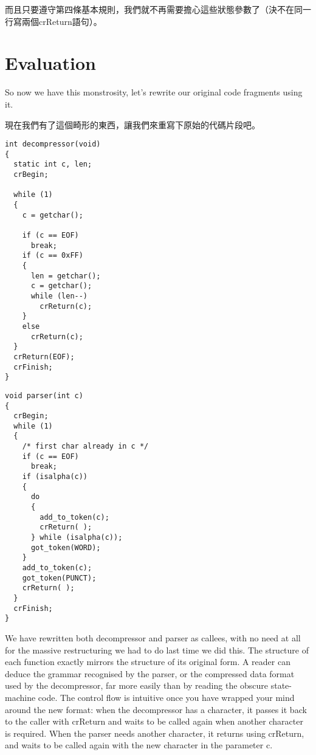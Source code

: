 \documentclass[12pt]{article}
\begin{document}
\begin{CJK}{UTF8}{bsmi}
而且只要遵守第四條基本規則，我們就不再需要擔心這些狀態參數了（決不在同一行寫兩個crReturn語句）。 

\section{Evaluation}

So now we have this monstrosity, let's rewrite our original code fragments using it.

現在我們有了這個畸形的東西，讓我們來重寫下原始的代碼片段吧。 

\newpage
\begin{multicols}{2}
\begin{lstlisting}[caption=decompressor, basicstyle=\footnotesize, breaklines=true]
int decompressor(void) 
{
  static int c, len;
  crBegin;

  while (1) 
  {
    c = getchar();

    if (c == EOF)
      break;
    if (c == 0xFF) 
    {
      len = getchar();
      c = getchar();
      while (len--)
        crReturn(c);
    } 
    else
      crReturn(c);
  }
  crReturn(EOF);
  crFinish;
}
\end{lstlisting}


\begin{lstlisting}[caption=parser, basicstyle=\footnotesize, breaklines=true]
void parser(int c) 
{
  crBegin;
  while (1) 
  {
    /* first char already in c */
    if (c == EOF)
      break;
    if (isalpha(c)) 
    {
      do 
      {
        add_to_token(c);
        crReturn( );
      } while (isalpha(c));
      got_token(WORD);
    }
    add_to_token(c);
    got_token(PUNCT);
    crReturn( );
  }
  crFinish;
}
\end{lstlisting}
\end{multicols}

We have rewritten both decompressor and parser as callees, with no need at all for the massive restructuring we had to do last time we did this. The structure of each function exactly mirrors the structure of its original form. A reader can deduce the grammar recognised by the parser, or the compressed data format used by the decompressor, far more easily than by reading the obscure state-machine code. The control flow is intuitive once you have wrapped your mind around the new format: when the decompressor has a character, it passes it back to the caller with crReturn and waits to be called again when another character is required. When the parser needs another character, it returns using crReturn, and waits to be called again with the new character in the parameter c.


\end{CJK}
\end{document}
